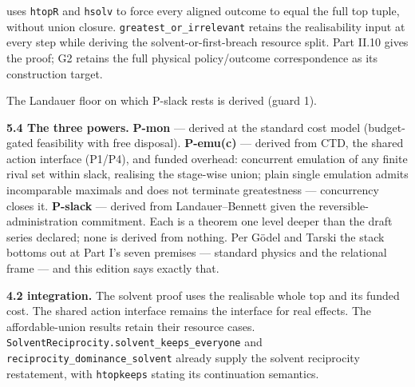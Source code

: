 \documentclass[
]{article}
\newcounter{none} %
\begin{document}
\begin{itemize}
  uses \texttt{htopR} and \texttt{hsolv} to force every aligned outcome
  to equal the full top tuple, without union closure.
  \texttt{g\allowbreak{}r\allowbreak{}e\allowbreak{}a\allowbreak{}t\allowbreak{}e\allowbreak{}s\allowbreak{}t\allowbreak{}\_\allowbreak{}o\allowbreak{}r\allowbreak{}\_\allowbreak{}i\allowbreak{}r\allowbreak{}r\allowbreak{}e\allowbreak{}l\allowbreak{}e\allowbreak{}v\allowbreak{}a\allowbreak{}n\allowbreak{}t}
  retains the realisability input at every step while deriving the
  solvent-or-first-breach resource split. Part II.10 gives the proof; G2
  retains the full physical policy/outcome correspondence as its
  construction target.
\end{itemize}

The Landauer floor on which P-slack rests is derived (guard 1).

\textbf{5.4 The three powers.} \textbf{P-mon} --- derived at the
standard cost model (budget-gated feasibility with free disposal).
\textbf{P-emu(c)} --- derived from CTD, the shared action interface
(P1/P4), and funded overhead: concurrent emulation of any finite rival
set within slack, realising the stage-wise union; plain single emulation
admits incomparable maximals and does not terminate greatestness ---
concurrency closes it. \textbf{P-slack} --- derived from
Landauer--Bennett given the reversible-administration commitment. Each
is a theorem one level deeper than the draft series declared; none is
derived from nothing. Per Gödel and Tarski the stack bottoms out at Part
I's seven premises --- standard physics and the relational frame --- and
this edition says exactly that.

\textbf{4.2 integration.} The solvent proof uses the realisable whole
top and its funded cost. The shared action interface remains the
interface for real effects. The affordable-union results retain their
resource cases.
\texttt{S\allowbreak{}o\allowbreak{}l\allowbreak{}v\allowbreak{}e\allowbreak{}n\allowbreak{}t\allowbreak{}R\allowbreak{}e\allowbreak{}c\allowbreak{}i\allowbreak{}p\allowbreak{}r\allowbreak{}o\allowbreak{}c\allowbreak{}i\allowbreak{}t\allowbreak{}y\allowbreak{}.\allowbreak{}s\allowbreak{}o\allowbreak{}l\allowbreak{}v\allowbreak{}e\allowbreak{}n\allowbreak{}t\allowbreak{}\_\allowbreak{}k\allowbreak{}e\allowbreak{}e\allowbreak{}p\allowbreak{}s\allowbreak{}\_\allowbreak{}e\allowbreak{}v\allowbreak{}e\allowbreak{}r\allowbreak{}y\allowbreak{}o\allowbreak{}n\allowbreak{}e}
and
\texttt{r\allowbreak{}e\allowbreak{}c\allowbreak{}i\allowbreak{}p\allowbreak{}r\allowbreak{}o\allowbreak{}c\allowbreak{}i\allowbreak{}t\allowbreak{}y\allowbreak{}\_\allowbreak{}d\allowbreak{}o\allowbreak{}m\allowbreak{}i\allowbreak{}n\allowbreak{}a\allowbreak{}n\allowbreak{}c\allowbreak{}e\allowbreak{}\_\allowbreak{}s\allowbreak{}o\allowbreak{}l\allowbreak{}v\allowbreak{}e\allowbreak{}n\allowbreak{}t}
already supply the solvent reciprocity restatement, with
\texttt{htopkeeps} stating its continuation semantics.
\end{document}
